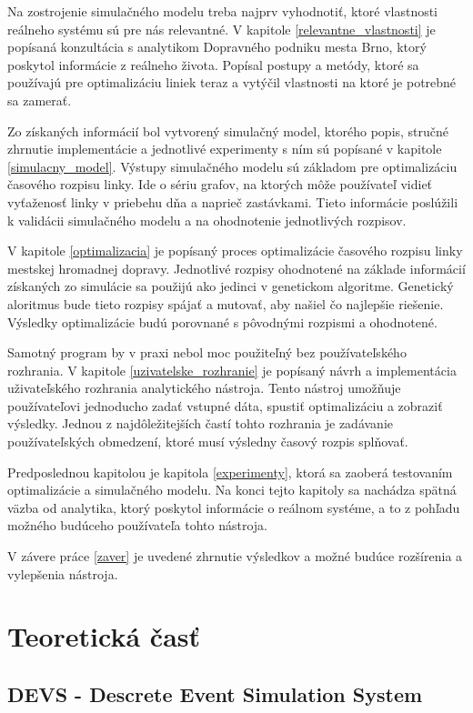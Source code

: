 Na zostrojenie simulačného modelu treba najprv vyhodnotiť, ktoré vlastnosti reálneho systému sú pre nás relevantné.
V kapitole \ref{relevantne_vlastnosti} je popísaná konzultácia s analytikom Dopravného podniku mesta Brno, ktorý poskytol informácie z reálneho života.
Popísal postupy a metódy, ktoré sa používajú pre optimalizáciu liniek teraz a vytýčil vlastnosti na ktoré je potrebné sa zamerať. 

Zo získaných informácií bol vytvorený simulačný model, ktorého popis, stručné zhrnutie implementácie a jednotlivé experimenty s ním sú popísané v kapitole \ref{simulacny_model}.
Výstupy simulačného modelu sú základom pre optimalizáciu časového rozpisu linky.
Ide o sériu grafov, na ktorých môže používateľ vidieť vyťaženosť linky v priebehu dňa a naprieč zastávkami.
Tieto informácie poslúžili k validácii simulačného modelu a na ohodnotenie jednotlivých rozpisov.

V kapitole \ref{optimalizacia} je popísaný proces optimalizácie časového rozpisu linky mestskej hromadnej dopravy.
Jednotlivé rozpisy ohodnotené na základe informácií získaných zo simulácie sa použijú ako jedinci v genetickom algoritme.
Genetický aloritmus bude tieto rozpisy spájať a mutovať, aby našiel čo najlepšie riešenie.
Výsledky optimalizácie budú porovnané s pôvodnými rozpismi a ohodnotené.

Samotný program by v praxi nebol moc použiteľný bez používateľského rozhrania.
V kapitole \ref{uzivatelske_rozhranie} je popísaný návrh a implementácia uživateľského rozhrania analytického nástroja.
Tento nástroj umožňuje používateľovi jednoducho zadať vstupné dáta, spustiť optimalizáciu a zobraziť výsledky.
Jednou z najdôležitejších častí tohto rozhrania je zadávanie používateľských obmedzení, ktoré musí výsledny časový rozpis splňovať.

Predposlednou kapitolou je kapitola \ref{experimenty}, ktorá sa zaoberá testovaním optimalizácie a simulačného modelu.
Na konci tejto kapitoly sa nachádza spätná väzba od analytika, ktorý poskytol informácie o reálnom systéme, a to z pohľadu možného budúceho používateľa tohto nástroja.

V závere práce \ref{zaver} je uvedené zhrnutie výsledkov a možné budúce rozšírenia a vylepšenia nástroja.

\chapter{Teoretická časť} %
\label{teoreticka_cast}
\section{DEVS - Descrete Event Simulation System}
